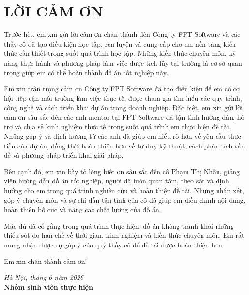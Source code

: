 \chapter*{LỜI CẢM ƠN}
\thispagestyle{empty}  %

Trước hết, em xin gửi lời cảm ơn chân thành đến Công ty FPT Software và các thầy cô đã tạo điều kiện học tập, rèn luyện và cung cấp cho em nền tảng kiến thức cần thiết trong suốt quá trình học tập. Những kiến thức chuyên môn, kỹ năng thực hành và phương pháp làm việc được tích lũy tại trường là cơ sở quan trọng giúp em có thể hoàn thành đồ án tốt nghiệp này.

Em xin trân trọng cảm ơn Công ty FPT Software đã tạo điều kiện để em có cơ hội tiếp cận môi trường làm việc thực tế, được tham gia tìm hiểu các quy trình, công nghệ và cách triển khai dự án trong doanh nghiệp. Đặc biệt, em xin gửi lời cảm ơn sâu sắc đến các anh mentor tại FPT Software đã tận tình hướng dẫn, hỗ trợ và chia sẻ kinh nghiệm thực tế trong suốt quá trình em thực hiện đề tài. Những góp ý và định hướng từ các anh đã giúp em hiểu rõ hơn về yêu cầu thực tiễn của dự án, đồng thời hoàn thiện hơn về tư duy kỹ thuật, cách phân tích vấn đề và phương pháp triển khai giải pháp.

Bên cạnh đó, em xin bày tỏ lòng biết ơn sâu sắc đến cô Phạm Thị Nhẫn, giảng viên hướng dẫn đồ án tốt nghiệp, người đã luôn quan tâm, theo sát và định hướng cho em trong quá trình nghiên cứu và hoàn thiện đề tài. Những nhận xét, góp ý chuyên môn và sự chỉ dẫn tận tình của cô đã giúp em điều chỉnh nội dung, hoàn thiện bố cục và nâng cao chất lượng của đồ án.

Mặc dù đã cố gắng trong quá trình thực hiện, đồ án không tránh khỏi những thiếu sót do hạn chế về thời gian, kinh nghiệm và kiến thức chuyên môn. Em rất mong nhận được sự góp ý của quý thầy cô để đề tài được hoàn thiện hơn.

Em xin chân thành cảm ơn!

\vspace{1cm}

\begin{flushright}
\textit{Hà Nội, tháng 6 năm 2026}\\[0.5cm]
\textbf{Nhóm sinh viên thực hiện}
\end{flushright}

\clearpage
